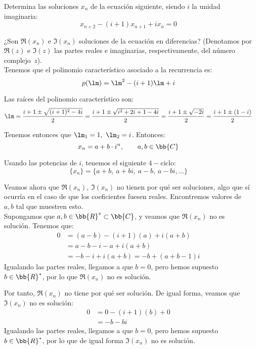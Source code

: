 \begin{ejercicio}
    Determina las soluciones $x_n$ de la ecuación siguiente, siendo $i$ la unidad imaginaria:
    \begin{equation*}
        x_{n+2} - (i + 1)x_{n+1} + ix_n = 0
    \end{equation*}
    
    ¿Son $\Re(x_n)$ e $\Im(x_n)$ soluciones de la ecuación en diferencias? (Denotamos por $\Re(z)$ e $\Im(z)$ las partes reales e imaginarias, respectivamente, del número complejo~$z$).\\

    Tenemos que el polinomio característico asociado a la recurrencia es:
    \begin{equation*}
        p(\lm)=\lm^2-(i+1)\lm + i
    \end{equation*}

    Las raíces del polinomio característico son:
    \begin{equation*}
        \lm = \frac{i+1 \pm \sqrt{(i+1)^2-4i}}{2}
        = \frac{i+1 \pm \sqrt{i^2+2i+1-4i}}{2}
        = \frac{i+1 \pm \sqrt{-2i}}{2}
        = \frac{i+1 \pm (1-i)}{2}
    \end{equation*}

    Tenemos entonces que $\lm_1=1,~\lm_2=i$. Entonces:
    \begin{equation*}
        x_n = a + b\cdot i^n,\qquad a,b\in \bb{C}
    \end{equation*}

    Usando las potencias de $i$, tenemos el siguiente $4-$ciclo:
    \begin{equation*}
        \{x_n\} = \{a+b,~a+bi,~a-b,~a-bi,\dots\}
    \end{equation*}

    Veamos ahora que $\Re(x_n),~\Im(x_n)$ no tienen por qué ser soluciones, algo que sí ocurría en el caso de que los coeficientes fuesen reales. Encontremos valores de $a,b$ tal que muestren esto. \\
    
    Supongamos que $a,b\in \bb{R}^\ast\subset \bb{C}$, y veamos que $\Re(x_n)$ no es solución. Tenemos que:
    \begin{align*}
        0 &= (a-b) - (i+1)(a) + i(a+b)\\
        &= a-b-i-a+i(a+b)\\
        &= -b-i+i(a+b) = -b + (a+b-1)i
    \end{align*}
    Igualando las partes reales, llegamos a que $b=0$, pero hemos supuesto $b\in \bb{R}^\ast$, por lo que $\Re(x_n)$ no es solución.
    
    Por tanto, $\Re(x_n)$ no tiene por qué ser solución. De igual forma, veamos que $\Im(x_n)$ no es solución:
    \begin{align*}
        0 &= 0 - (i+1)(b) + 0\\
        &= -b-bi
    \end{align*}
    Igualando las partes reales, llegamos a que $b=0$, pero hemos supuesto $b\in \bb{R}^\ast$, por lo que de igual forma $\Im(x_n)$ no es solución.
\end{ejercicio}